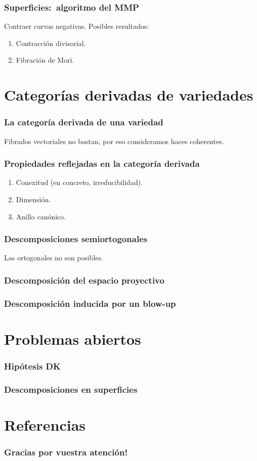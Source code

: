 \documentclass[12pt]{beamer}
\begin{document}
\begin{frame}
  \frametitle{Superficies:~algoritmo del MMP}
  Contraer curvas negativas.
  Posibles resultados:
  \begin{enumerate}
    \item Contracción divisorial.
    \item Fibración de Mori.
  \end{enumerate}
\end{frame}

\section{Categorías derivadas de variedades}

\begin{frame}
  \frametitle{La categoría derivada de una variedad}
  Fibrados vectoriales no bastan, por eso consideramos haces coherentes.
\end{frame}

\begin{frame}
  \frametitle{Propiedades reflejadas en la categoría derivada}
  \begin{enumerate}
    \item Conexitud (en concreto, irreducibilidad).
    \item Dimensión.
    \item Anillo canónico.
  \end{enumerate}
\end{frame}

\begin{frame}
  \frametitle{Descomposiciones semiortogonales}
  Las ortogonales no son posibles.
\end{frame}

\begin{frame}
  \frametitle{Descomposición del espacio proyectivo}
\end{frame}

\begin{frame}
  \frametitle{Descomposición inducida por un blow-up}
\end{frame}

\section{Problemas abiertos}

\begin{frame}
  \frametitle{Hipótesis DK}
\end{frame}

\begin{frame}
  \frametitle{Descomposiciones en superficies}
\end{frame}

\section{Referencias}

\begin{frame}
  \frametitle{Gracias por vuestra atención!}
  \nocite{gm03}
  \nocite{huy06}
  \nocite{kaw17}
  \nocite{mat02}
  \printbibliography[heading=none]
\end{frame}
\end{document}
